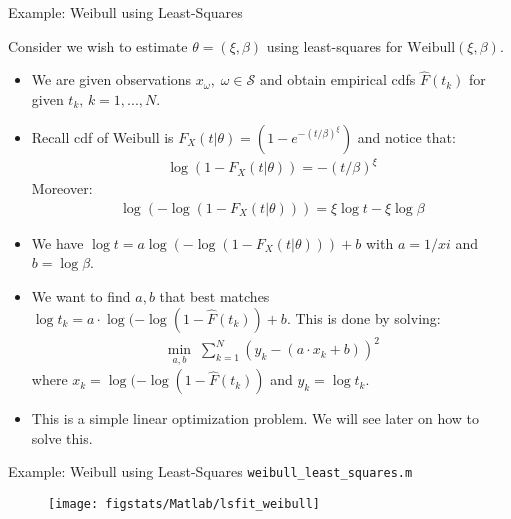 \documentclass[9pt]{beamer}
\begin{document}
%
\begin{frame}{Example: Weibull using Least-Squares}

Consider we wish to estimate $\theta=(\xi,\beta)$ using least-squares for $\textrm{Weibull}(\xi,\beta)$. 
\begin{itemize}
\item We are given observations $x_\omega,\; \omega \in \mathcal{S}$ and obtain empirical cdfs $\hat{F}(t_k)$ for given $t_k,\, k=1,...,N$. 
\item Recall cdf of Weibull is $F_X(t|\theta)=(1-e^{-(t/\beta)^\xi})$ and notice that:
\begin{align*}
\log(1-F_X(t|\theta))=-(t/\beta)^\xi
\end{align*}
Moreover:
\begin{align*}
\log(-\log(1-F_X(t|\theta)))= \xi \log t-\xi \log \beta
\end{align*}
\item We have $\log t=a\log(-\log(1-F_X(t|\theta)))+b$ with $a=1/xi$ and $b=\log\beta$. 
\item We want to find $a,b$ that best matches $\log t_k=a\cdot \log(-\log(1-\hat{F}(t_k))+b$. This is done by solving:
\begin{align*}
\min_{a,b}\; \sum_{k=1}^N\left (y_k-(a\cdot x_k+b)\right)^2
\end{align*}
where $x_k=\log(-\log(1-\hat{F}(t_k))$ and $y_k=\log t_k$. 
\item This is a simple linear optimization problem. We will see later on how to solve this. 
\end{itemize}


\end{frame}

%
\begin{frame}{Example: Weibull using Least-Squares \footnotesize{\texttt{weibull\_least\_squares.m}}}

\begin{figure}[!htb]
    \centering
	\texttt{[image: figstats/Matlab/lsfit\_weibull]}
\end{figure}

\end{frame}
\end{document}
